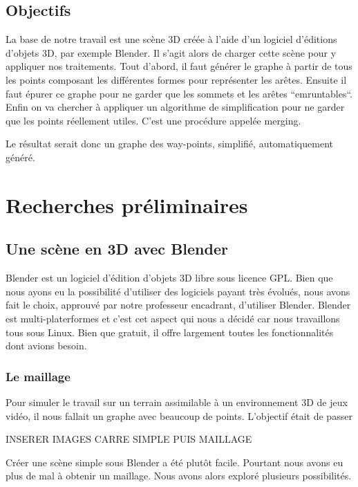 \documentclass[a4paper,12pt]{report}
\begin{document}
\section*{Objectifs}

La base de notre travail est une scène 3D créée à l'aide d'un logiciel d'éditions d'objets 3D, par exemple Blender. Il s'agit alors de charger cette scène pour y appliquer nos traitements. Tout d'abord, il faut générer le graphe à partir de tous les points composant les différentes formes pour représenter les arêtes. Ensuite il faut épurer ce graphe pour ne garder que les sommets et les arêtes ``emruntables``. Enfin on va chercher à appliquer un algorithme de simplification pour ne garder que les points réellement utiles. C'est une procédure appelée merging.

Le résultat serait donc un graphe des way-points, simplifié, automatiquement généré.

\chapter{Recherches préliminaires}

\section{Une scène en 3D avec Blender}

Blender est un logiciel d'édition d'objets 3D libre sous licence GPL. Bien que nous ayons eu la possibilité d'utiliser des logiciels payant très évolués, nous avons fait le choix, approuvé par notre professeur encadrant, d'utiliser Blender. Blender est multi-platerformes et c'est cet aspect qui nous a décidé car nous travaillons tous sous Linux. Bien que gratuit, il offre largement toutes les fonctionnalités dont avions besoin.

\subsection{Le maillage}

Pour simuler le travail sur un terrain assimilable à un environnement 3D de jeux vidéo, il nous fallait un graphe avec beaucoup de points. L'objectif était de passer 

INSERER IMAGES CARRE SIMPLE PUIS MAILLAGE

Créer une scène simple sous Blender a été plutôt facile. Pourtant nous avons eu plus de mal à obtenir un maillage. Nous avons alors exploré plusieurs possibilités.
\end{document}
